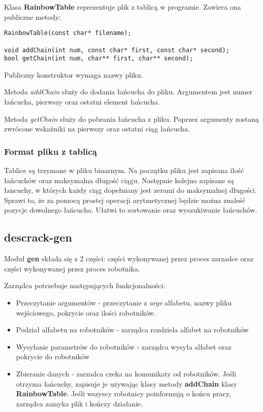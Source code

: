 \documentclass[a4paper,11pt]{article}
\begin{document}
Klasa \textbf{RainbowTable} reprezentuje plik z tablicą w programie. Zawiera ona publiczne metody:

\begin{lstlisting}
RainbowTable(const char* filename);

void addChain(int num, const char* first, const char* second);
bool getChain(int num, char** first, char** second);
\end{lstlisting}

Publiczny konstruktor wymaga nazwy pliku.

Metoda \emph{addChain} służy do dodania łańcucha do pliku. Argumentem jest numer łańcucha, pierwszy oraz ostatni element łańcucha.

Metoda \emph{getChain} służy do pobrania łańcucha z pliku. Poprzez argumenty zostaną zwrócone wskaźniki na pierwszy oraz ostatni ciąg łańcucha.

\subsubsection{Format pliku z tablicą}

Tablice są trzymane w pliku binarnym. Na początku pliku jest zapisana ilość łańcuchów oraz maksymalna długość ciągu. Następnie kolejno zapisane są łancuchy, w których każdy ciąg dopełniany jest zerami do maksymalnej długości. Sprawi to, że za pomocą prostej operacji arytmetycznej będzie można znaleść pozycje dowolnego łańcucha. Ułatwi to sortowanie oraz wyszukiwanie łańcuchów.

\subsection{descrack-gen}

Moduł \textbf{gen} składa się z 2 części: części wykonywanej przez proces zarzadce oraz części wykonywanej przez proces robotnika.

Zarządca potrzebuje następujących funkcjonalności:
\begin{itemize}
	\item Przeczytanie argumentów - przeczytanie z \emph{argv} alfabetu, nazwy pliku wejściowego, pokrycie oraz ilości robotników.
	\item Podział alfabetu na robotników - zarządca rozdziela alfabet na robotników
	\item Wysyłanie parametrów do robotników - zarządca wysyła alfabet oraz pokrycie do robotników
	\item Zbieranie danych - zarzadca czeka na komunikaty od robotników. Jeśli otrzyma łańcuchy, zapisuje je używając klasy metody \textbf{addChain} klasy \textbf{RainbowTable}. Jeśli wszyscy robotnicy poinformują o końcu pracy, zarządca zamyka plik i kończy działanie.
\end{itemize}
\end{document}
